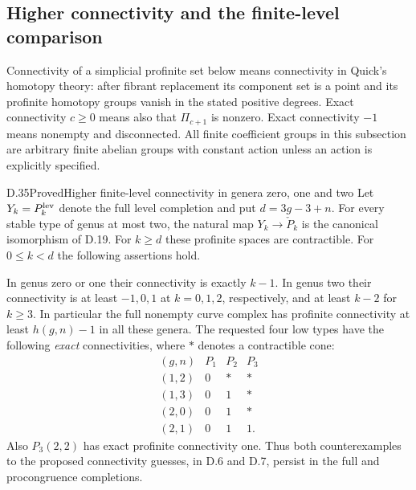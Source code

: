\subsection{Higher connectivity and the finite-level comparison}

Connectivity of a simplicial profinite set below means connectivity
in Quick's homotopy theory: after fibrant replacement its component
set is a point and its profinite homotopy groups vanish in the stated
positive degrees.  Exact connectivity $c\geq0$ means also that
$\Pi_{c+1}$ is nonzero.  Exact connectivity $-1$ means nonempty and
disconnected.  All finite coefficient groups in this subsection are
arbitrary finite abelian groups with constant action unless an action
is explicitly specified.

\begin{result}{D.35}{Proved}{Higher finite-level connectivity in genera zero, one and two}
Let $Y_k=P_k^{\rm lev}$ denote the full level completion and put
$d=3g-3+n$.  For every stable type of genus at most two, the natural
map $Y_k\to\check P_k$ is the canonical isomorphism of D.19.
For $k\geq d$ these profinite spaces are contractible.  For
$0\leq k<d$ the following assertions hold.

In genus zero or one their connectivity is exactly $k-1$.
In genus two their connectivity is at least $-1,0,1$ at
$k=0,1,2$, respectively, and at least $k-2$ for $k\geq3$.
In particular the full nonempty curve complex has profinite
connectivity at least $h(g,n)-1$ in all these genera.
The requested four low types have the following \emph{exact}
connectivities, where $\ast$ denotes a contractible cone:
\[
\begin{array}{c|ccc}
(g,n)&P_1&P_2&P_3\\\hline
(1,2)&0&\ast&\ast\\
(1,3)&0&1&\ast\\
(2,0)&0&1&\ast\\
(2,1)&0&1&1.
\end{array}                                                    \tag{D.61}
\]
Also $P_3(2,2)$ has exact profinite connectivity one.  Thus both
counterexamples to the proposed connectivity guesses, in D.6 and
D.7, persist in the full and procongruence completions.


\end{result}
